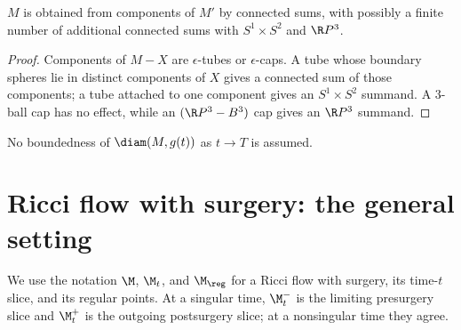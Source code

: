 \begin{lemma}
  \label{lem:kl-structure-at-first-singularity-time-structure-at-first-singularity-time-lemma-11}
 \label{reconstruct}
$M$ is obtained from components of $M'$ by connected sums, with possibly a
finite number of additional connected sums with $S^1\times S^2$ and $\R P^3$.
\end{lemma}
\begin{proof}
\sketch Components of $M-X$ are $\epsilon$-tubes or $\epsilon$-caps. A tube
whose boundary spheres lie in distinct components of $X$ gives a connected sum
of those components; a tube attached to one component gives an
$S^1\times S^2$ summand. A $3$-ball cap has no effect, while an
$(\R P^3-B^3)$ cap gives an $\R P^3$ summand.
\end{proof}

\begin{remark}
  \label{rem:kl-structure-at-first-singularity-time-estimates-diameter}

No boundedness of $\diam(M,g(t))$ as $t\to T$ is assumed.
\end{remark}

\section{Ricci flow with surgery: the general setting}
\label{Ricci flow with surgery}

We use the notation $\M$, $\M_t$, and $\M_{\reg}$ for a Ricci flow with
surgery, its time-$t$ slice, and its regular points. At a singular time,
$\M_t^-$ is the limiting presurgery slice and $\M_t^+$ is the outgoing
postsurgery slice; at a nonsingular time they agree.

